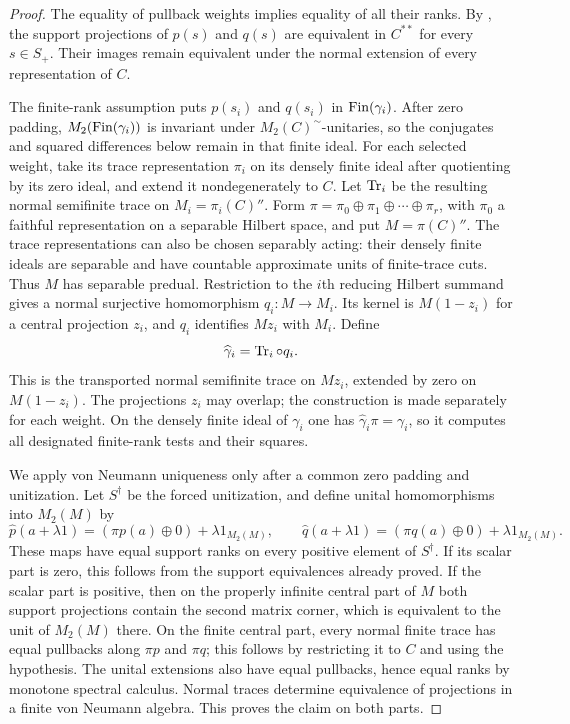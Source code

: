 \begin{proof}
The equality of pullback weights implies equality of all their ranks.
By \cite[Lemma~5.1]{CGNN}, the support projections of $p(s)$ and $q(s)$
are equivalent in $C^{**}$ for every $s\in S_+$.  Their images remain
equivalent under the normal extension of every representation of $C$.

The finite-rank assumption puts $p(s_i)$ and $q(s_i)$ in
$\operatorname{Fin}(\gamma_i)$. After zero padding, $M_2(\operatorname{Fin}(\gamma_i))$ is invariant under
$M_2(C)^{\sim}$-unitaries, so the conjugates and squared differences
below remain in that finite ideal.
For each selected weight, take its trace representation $\pi_i$ on
its densely finite ideal after quotienting by its zero ideal, and
extend it nondegenerately to $C$.  Let $\operatorname{Tr}_i$ be the resulting normal
semifinite trace on $M_i=\pi_i(C)''$.  Form
$\pi=\pi_0\oplus\pi_1\oplus\cdots\oplus\pi_r$, with $\pi_0$
a faithful representation on a separable Hilbert space, and put
$M=\pi(C)''$.  The trace representations can also be chosen separably
acting: their densely finite ideals are separable and have countable
approximate units of finite-trace cuts.  Thus $M$ has separable predual.
Restriction to the $i$th reducing Hilbert summand gives a normal
surjective homomorphism $q_i:M\to M_i$.  Its kernel is
$M(1-z_i)$ for a central projection $z_i$, and $q_i$ identifies
$Mz_i$ with $M_i$.  Define
\[
 \widehat\gamma_i=\operatorname{Tr}_i\circ q_i.
\]
This is the transported normal semifinite trace on $Mz_i$, extended
by zero on $M(1-z_i)$.  The projections $z_i$ may overlap; the
construction is made separately for each weight.  On the densely
finite ideal of $\gamma_i$ one has
$\widehat\gamma_i\pi=\gamma_i$, so it computes all designated
finite-rank tests and their squares.

We apply von Neumann uniqueness only after a common zero padding and
unitization.  Let $S^\dagger$ be the forced unitization, and define
unital homomorphisms into $M_2(M)$ by
\[
 \widehat p(a+\lambda1)=(\pi p(a)\oplus0)+\lambda1_{M_2(M)},\qquad
 \widehat q(a+\lambda1)=(\pi q(a)\oplus0)+\lambda1_{M_2(M)}.
\]
These maps have equal support ranks on every positive element of
$S^\dagger$.  If its scalar part is zero, this follows from the
support equivalences already proved.  If the scalar part is positive,
then on the properly infinite central part of $M$ both support
projections contain the second matrix corner, which is equivalent to
the unit of $M_2(M)$ there.  On the finite central part, every normal
finite trace has equal pullbacks along $\pi p$ and $\pi q$; this follows
by restricting it to $C$ and using the hypothesis.  The unital
extensions also have equal pullbacks, hence equal ranks by monotone
spectral calculus.  Normal traces determine equivalence of projections
in a finite von Neumann algebra.  This proves the claim on both parts.


\end{proof}
